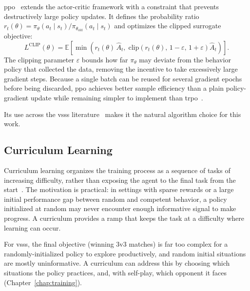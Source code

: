 \gls{ppo}~\cite{schulman2017ppo} extends the actor-critic framework with a
constraint that prevents destructively large policy updates.  It defines the
probability ratio $r_t(\theta) = \pi_\theta(a_t \mid s_t) /
\pi_{\theta_\mathrm{old}}(a_t \mid s_t)$ and optimizes the clipped surrogate
objective:
%
\begin{equation}
    L^{\mathrm{CLIP}}(\theta) =
    \mathbb{E}\!\left[
        \min\!\left(
            r_t(\theta)\,\hat{A}_t,\;
            \mathrm{clip}\!\left(r_t(\theta),\,1-\varepsilon,\,1+\varepsilon\right)
            \hat{A}_t
        \right)
    \right].
    \label{eq:ppo}
\end{equation}
%
The clipping parameter $\varepsilon$ bounds how far $\pi_\theta$ may deviate
from the behavior policy that collected the data, removing the incentive to
take excessively large gradient steps.  Because a single batch can be reused
for several gradient epochs before being discarded, \gls{ppo} achieves better
sample efficiency than a plain policy-gradient update while remaining simpler
to implement than \gls{trpo}~\cite{schulman2015trpo}.


Its use across the \gls{vsss} literature~\cite{tg_thiago,tg_thay,brandao2022} makes it the
natural algorithm choice for this work.

\subsection{Curriculum Learning}

Curriculum learning organizes the training process as a sequence of tasks of
increasing difficulty, rather than exposing the agent to the final task from
the start~\cite{bengio2009curriculum}.  The motivation is practical: in
settings with sparse rewards or a large initial performance gap between random
and competent behavior, a policy initialized at random may never encounter
enough informative signal to make progress.  A curriculum provides a ramp that
keeps the task at a difficulty where learning can occur.

For \gls{vsss}, the final objective (winning 3v3 matches) is far too complex
for a randomly-initialized policy to explore productively, and random initial
situations are mostly uninformative.  A curriculum can address this by choosing which situations the policy practices,
and, with self-play, which opponent it faces (Chapter~\ref{chap:training}).

